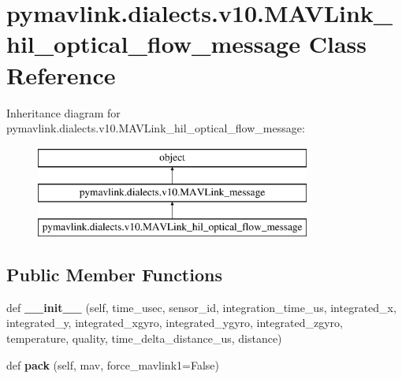 \hypertarget{classpymavlink_1_1dialects_1_1v10_1_1MAVLink__hil__optical__flow__message}{}\section{pymavlink.\+dialects.\+v10.\+M\+A\+V\+Link\+\_\+hil\+\_\+optical\+\_\+flow\+\_\+message Class Reference}
\label{classpymavlink_1_1dialects_1_1v10_1_1MAVLink__hil__optical__flow__message}
Inheritance diagram for pymavlink.\+dialects.\+v10.\+M\+A\+V\+Link\+\_\+hil\+\_\+optical\+\_\+flow\+\_\+message\+:\begin{figure}[H]
\begin{center}
\leavevmode
\includegraphics[height=3.000000cm]{classpymavlink_1_1dialects_1_1v10_1_1MAVLink__hil__optical__flow__message}
\end{center}
\end{figure}
\subsection*{Public Member Functions}
\begin{DoxyCompactItemize}
\item 
\mbox{\label{classpymavlink_1_1dialects_1_1v10_1_1MAVLink__hil__optical__flow__message_a31e4b523e17f343736db6615077f1512}} 
def {\bfseries \+\_\+\+\_\+init\+\_\+\+\_\+} (self, time\+\_\+usec, sensor\+\_\+id, integration\+\_\+time\+\_\+us, integrated\+\_\+x, integrated\+\_\+y, integrated\+\_\+xgyro, integrated\+\_\+ygyro, integrated\+\_\+zgyro, temperature, quality, time\+\_\+delta\+\_\+distance\+\_\+us, distance)
\item 
\mbox{\label{classpymavlink_1_1dialects_1_1v10_1_1MAVLink__hil__optical__flow__message_a280a0f99a12e304fdd612bc7c5049982}} 
def {\bfseries pack} (self, mav, force\+\_\+mavlink1=False)
\end{DoxyCompactItemize}
